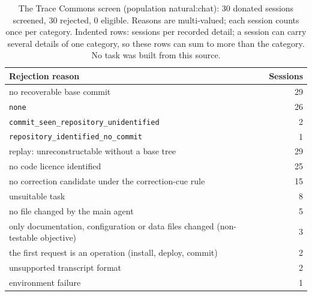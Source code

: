 \begin{table}[t]\centering\footnotesize
\caption{The Trace Commons screen (population natural:chat): 30 donated sessions screened, 30 rejected, 0 eligible. Reasons are multi-valued; each session counts once per category. Indented rows: sessions per recorded detail; a session can carry several details of one category, so these rows can sum to more than the category. No task was built from this source.}\label{tab:trace-commons}
\begin{tabular}{lr}\toprule Rejection reason & Sessions \\\midrule
no recoverable base commit & 29 \\
\quad \texttt{none} & 26 \\
\quad \texttt{commit\_seen\_repository\_unidentified} & 2 \\
\quad \texttt{repository\_identified\_no\_commit} & 1 \\
replay: unreconstructable without a base tree & 29 \\
no code licence identified & 25 \\
no correction candidate under the correction-cue rule & 15 \\
unsuitable task & 8 \\
\quad no file changed by the main agent & 5 \\
\quad only documentation, configuration or data files changed (non-testable objective) & 3 \\
\quad the first request is an operation (install, deploy, commit) & 2 \\
unsupported transcript format & 2 \\
environment failure & 1 \\
\bottomrule\end{tabular}\end{table}
